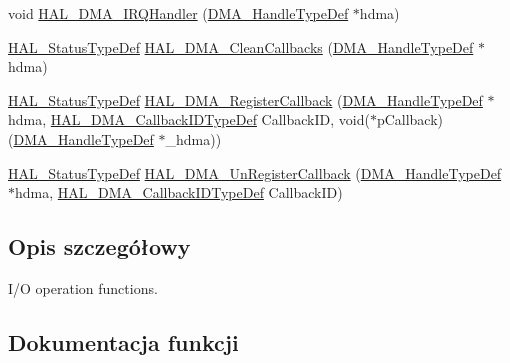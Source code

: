 \begin{DoxyCompactItemize}
\item 
void \hyperlink{group___d_m_a___exported___functions___group2_ga8c8564d06f6d39b702af1c5cbb7dd54a}{H\+A\+L\+\_\+\+D\+M\+A\+\_\+\+I\+R\+Q\+Handler} (\hyperlink{group___d_m_a___exported___types_ga41b754a906b86bce54dc79938970138b}{D\+M\+A\+\_\+\+Handle\+Type\+Def} $\ast$hdma)
\item 
\hyperlink{stm32f4xx__hal__def_8h_a63c0679d1cb8b8c684fbb0632743478f}{H\+A\+L\+\_\+\+Status\+Type\+Def} \hyperlink{group___d_m_a___exported___functions___group2_gaf511e4e6e0653fafdd9b40ce4a08b1db}{H\+A\+L\+\_\+\+D\+M\+A\+\_\+\+Clean\+Callbacks} (\hyperlink{group___d_m_a___exported___types_ga41b754a906b86bce54dc79938970138b}{D\+M\+A\+\_\+\+Handle\+Type\+Def} $\ast$hdma)
\item 
\hyperlink{stm32f4xx__hal__def_8h_a63c0679d1cb8b8c684fbb0632743478f}{H\+A\+L\+\_\+\+Status\+Type\+Def} \hyperlink{group___d_m_a___exported___functions___group2_gaabec77de08a59c94f2c6265ce7ae8261}{H\+A\+L\+\_\+\+D\+M\+A\+\_\+\+Register\+Callback} (\hyperlink{group___d_m_a___exported___types_ga41b754a906b86bce54dc79938970138b}{D\+M\+A\+\_\+\+Handle\+Type\+Def} $\ast$hdma, \hyperlink{group___d_m_a___exported___types_gafbe8b2bd9ce2128de6cdc08ccde7e8ad}{H\+A\+L\+\_\+\+D\+M\+A\+\_\+\+Callback\+I\+D\+Type\+Def} Callback\+ID, void($\ast$p\+Callback)(\hyperlink{group___d_m_a___exported___types_ga41b754a906b86bce54dc79938970138b}{D\+M\+A\+\_\+\+Handle\+Type\+Def} $\ast$\+\_\+hdma))
\item 
\hyperlink{stm32f4xx__hal__def_8h_a63c0679d1cb8b8c684fbb0632743478f}{H\+A\+L\+\_\+\+Status\+Type\+Def} \hyperlink{group___d_m_a___exported___functions___group2_ga87842d3780f0e54c7fb29a003e6b5ac4}{H\+A\+L\+\_\+\+D\+M\+A\+\_\+\+Un\+Register\+Callback} (\hyperlink{group___d_m_a___exported___types_ga41b754a906b86bce54dc79938970138b}{D\+M\+A\+\_\+\+Handle\+Type\+Def} $\ast$hdma, \hyperlink{group___d_m_a___exported___types_gafbe8b2bd9ce2128de6cdc08ccde7e8ad}{H\+A\+L\+\_\+\+D\+M\+A\+\_\+\+Callback\+I\+D\+Type\+Def} Callback\+ID)
\end{DoxyCompactItemize}


\subsection{Opis szczegółowy}
I/O operation functions. 



\subsection{Dokumentacja funkcji}
\mbox{\label{group___d_m_a___exported___functions___group2_ga001f9fb04328a7460f9ff16908ff987c}} 
